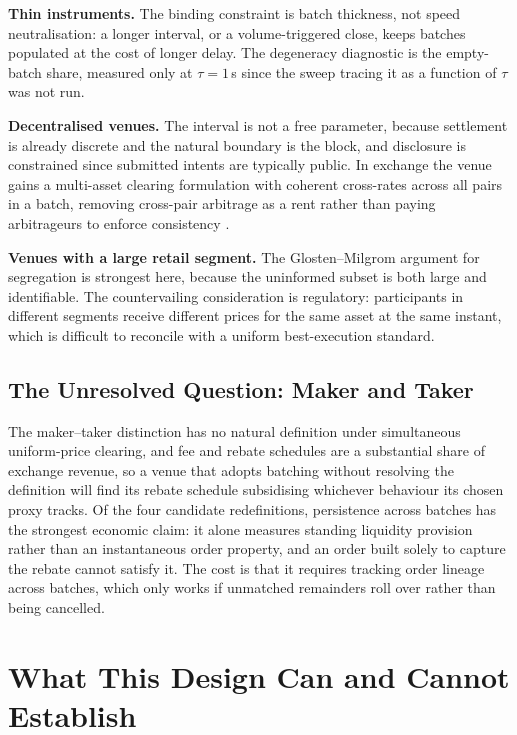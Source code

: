 \textbf{Thin instruments.} The binding constraint is batch thickness, not
speed neutralisation: a longer interval, or a volume-triggered close, keeps
batches populated at the cost of longer delay. The degeneracy diagnostic is
the empty-batch share, measured only at $\tau=1$\,s since the sweep tracing
it as a function of $\tau$ was not run.

\textbf{Decentralised venues.} The interval is not a free parameter,
because settlement is already discrete and the natural boundary is the
block, and disclosure is constrained since submitted intents are typically
public. In exchange the venue gains a multi-asset clearing formulation with
coherent cross-rates across all pairs in a batch, removing cross-pair
arbitrage as a rent rather than paying arbitrageurs to enforce consistency
\citep{walther2021multitoken,ramsay2023speedex}.

\textbf{Venues with a large retail segment.} The Glosten--Milgrom argument
for segregation is strongest here, because the uninformed subset is both
large and identifiable. The countervailing consideration is regulatory:
participants in different segments receive different prices for the same
asset at the same instant, which is difficult to reconcile with a uniform
best-execution standard.

\subsection{The Unresolved Question: Maker and Taker}

The maker--taker distinction has no natural definition under simultaneous
uniform-price clearing, and fee and rebate schedules are a substantial
share of exchange revenue, so a venue that adopts batching without
resolving the definition will find its rebate schedule subsidising
whichever behaviour its chosen proxy tracks. Of the four candidate
redefinitions, persistence across batches has the strongest economic claim:
it alone measures standing liquidity provision rather than an instantaneous
order property, and an order built solely to capture the rebate cannot
satisfy it. The cost is that it requires tracking order lineage across
batches, which only works if unmatched remainders roll over rather than
being cancelled.

\section{What This Design Can and Cannot Establish}
\label{sec:testable2}

